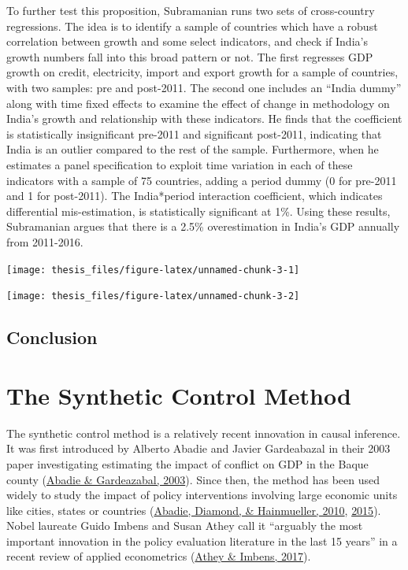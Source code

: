 \documentclass[12pt,nobind, a4paper]{reedthesis}
\begin{document}
 To further test this proposition, Subramanian runs two sets of cross-country regressions. The idea is to identify a sample of countries which have a robust correlation between growth and some select indicators, and check if India's growth numbers fall into this broad pattern or not. The first regresses GDP growth on credit, electricity, import and export growth for a sample of countries, with two samples: pre and post-2011. The second one includes an ``India dummy'' along with time fixed effects to examine the effect of change in methodology on India's growth and relationship with these indicators. He finds that the coefficient is statistically insignificant pre-2011 and significant post-2011, indicating that India is an outlier compared to the rest of the sample. Furthermore, when he estimates a panel specification to exploit time variation in each of these indicators with a sample of 75 countries, adding a period dummy (0 for pre-2011 and 1 for post-2011). The India*period interaction coefficient, which indicates differential mis-estimation, is statistically significant at 1\%. Using these results, Subramanian argues that there is a 2.5\% overestimation in India's GDP annually from 2011-2016.
 \begin{center}\texttt{[image: thesis\_files/figure-latex/unnamed-chunk-3-1]} \end{center}
 \begin{center}\texttt{[image: thesis\_files/figure-latex/unnamed-chunk-3-2]} \end{center}

 \hypertarget{conclusion}{%
 \section{Conclusion}\label{conclusion}}

 \hypertarget{the-synthetic-control-method}{%
 \chapter{The Synthetic Control Method}\label{the-synthetic-control-method}}

 The synthetic control method is a relatively recent innovation in causal inference. It was first introduced by Alberto Abadie and Javier Gardeabazal in their 2003 paper investigating estimating the impact of conflict on GDP in the Baque county (\protect\hyperlink{ref-abadie_economic_2003}{Abadie \& Gardeazabal, 2003}). Since then, the method has been used widely to study the impact of policy interventions involving large economic units like cities, states or countries (\protect\hyperlink{ref-abadie_synthetic_2010}{Abadie, Diamond, \& Hainmueller, 2010}, \protect\hyperlink{ref-abadie_comparative_2015}{2015}). Nobel laureate Guido Imbens and Susan Athey call it ``arguably the most important innovation in the policy evaluation literature in the last 15 years'' in a recent review of applied econometrics (\protect\hyperlink{ref-athey_state_2017}{Athey \& Imbens, 2017}).
 \linebreak
\end{document}
